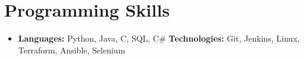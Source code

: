\documentclass[letterpaper,11pt]{article}
\newcommand{\resumeSubHeadingListStart}{\begin{itemize}[leftmargin=*]}
\newcommand{\resumeSubHeadingListEnd}{\end{itemize}}
\begin{document}
\section{Programming Skills}
  \resumeSubHeadingListStart
    \item{
      \textbf{Languages:}{ Python, Java, C, SQL, C\#}
      \hfill
      \textbf{Technologies:}{ Git, Jenkins, Linux, Terraform, Ansible, Selenium}
    }
  \resumeSubHeadingListEnd


\end{document}
